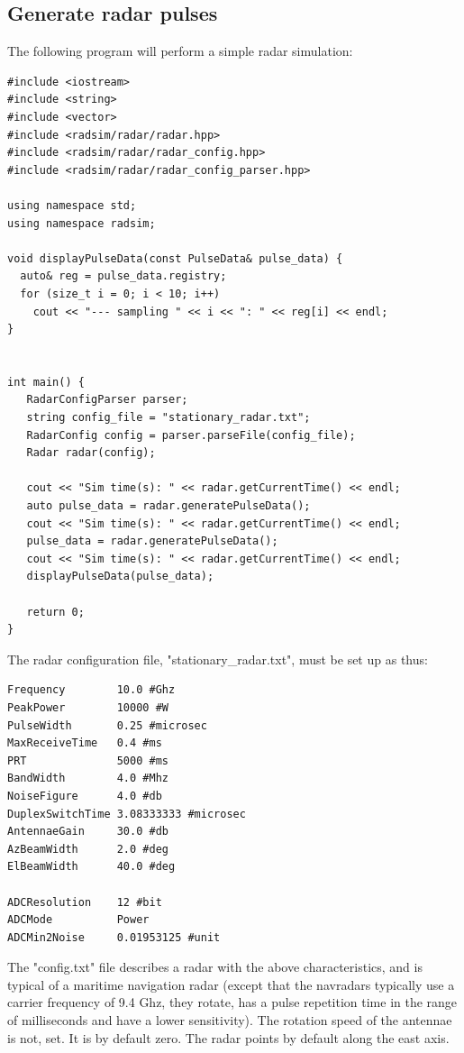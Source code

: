 \documentclass[letterpaper]{book}
\begin{document}
\subsection{Generate radar pulses} \label{subsec:gen_pulse}
The following program will perform a simple radar simulation:
\begin{lstlisting}
#include <iostream>
#include <string>
#include <vector>
#include <radsim/radar/radar.hpp>
#include <radsim/radar/radar_config.hpp>
#include <radsim/radar/radar_config_parser.hpp>

using namespace std;
using namespace radsim;

void displayPulseData(const PulseData& pulse_data) {
  auto& reg = pulse_data.registry;
  for (size_t i = 0; i < 10; i++)
    cout << "--- sampling " << i << ": " << reg[i] << endl;
}


int main() {
   RadarConfigParser parser;
   string config_file = "stationary_radar.txt";
   RadarConfig config = parser.parseFile(config_file);
   Radar radar(config);

   cout << "Sim time(s): " << radar.getCurrentTime() << endl;
   auto pulse_data = radar.generatePulseData();
   cout << "Sim time(s): " << radar.getCurrentTime() << endl;
   pulse_data = radar.generatePulseData();
   cout << "Sim time(s): " << radar.getCurrentTime() << endl;
   displayPulseData(pulse_data);
   
   return 0;
}
\end{lstlisting}
The radar configuration file, "stationary\_radar.txt", must be set up as thus:
\begin{verbatim}
Frequency        10.0 #Ghz
PeakPower        10000 #W
PulseWidth       0.25 #microsec
MaxReceiveTime   0.4 #ms
PRT              5000 #ms
BandWidth        4.0 #Mhz
NoiseFigure      4.0 #db
DuplexSwitchTime 3.08333333 #microsec
AntennaeGain     30.0 #db
AzBeamWidth      2.0 #deg
ElBeamWidth      40.0 #deg

ADCResolution    12 #bit
ADCMode          Power
ADCMin2Noise     0.01953125 #unit
\end{verbatim}
The "config.txt" file describes a radar with the above characteristics, and is typical of a maritime navigation radar (except that the navradars typically use a carrier frequency of 9.4 Ghz, they rotate, has a pulse repetition time in the range of milliseconds and have a lower sensitivity). The rotation speed of the antennae is not, set. It is by default zero. The radar points by default along the east axis. 
\end{document}
